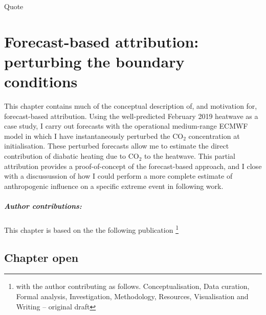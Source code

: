 \begin{savequote}[8cm]
    Quote
\end{savequote}
    
\chapter{\label{ch3}Forecast-based attribution: perturbing the boundary conditions}

This chapter contains much of the conceptual description of, and motivation for, forecast-based attribution. Using the well-predicted February 2019 heatwave as a case study, I carry out forecasts with the operational medium-range ECMWF model in which I have instantaneously perturbed the CO$_2$ concentration at initialisation. These perturbed forecasts allow me to estimate the direct contribution of diabatic heating due to CO$_2$ to the heatwave. This partial attribution provides a proof-of-concept of the forecast-based approach, and I close with a discussussion of how I could perform a more complete estimate of anthropogenic influence on a specific extreme event in following work.
\small\paragraph{Author contributions:} This chapter is based on the the following publication \footnote{with the author contributing as follows. Conceptualisation, Data curation, Formal analysis, Investigation, Methodology, Resources, Visualisation and Writing -- original draft} \par\vspace{1em}

\clearpage

\minitoc

\clearpage

\section{Chapter open}

